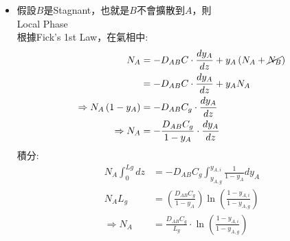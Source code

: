 \documentclass[../main.tex]{subfiles}
\begin{document}
\begin{itemize}
\begin{itemize}
\begin{figure}[H]
        \caption{已知邊界濃度，求交界面濃度示意圖}
      \end{figure}
      當題目假設濃度很稀薄，且亨利定律在各溫度下為定值，則可用代數法，得到($x_{A,i},y_{A,i}$)
      \begin{align}
        &\frac{y_{A,g}-y_{A,i}}{x_{A,i}-x_{A,l}} = -\frac{k'_x}{k'_y} \nonumber\\
        \implies \quad & y_{A,g}-y_{A,i} = -\frac{k'_x}{k'_y}\left(x_{A,i}-x_{A,l}\right) \nonumber\\
        \implies \quad & y_{A,g} + \frac{k'_x}{k'_y} x_{A,l} = y_{A,i} + \frac{k'_x}{k'_y} x_{A,i} \nonumber\\
        \implies \quad & y_{A,g} + \frac{k'_x}{k'_y} x_{A,l} = H_A x_{A,i} + \frac{k'_x}{k'_y} x_{A,i} \nonumber\\
        \implies \quad & y_{A,g} + \frac{k'_x}{k'_y} x_{A,l} = \left(H_A + \frac{k'_x}{k'_y}\right) x_{A,i} \nonumber\\
        \implies \quad & \boxed{x_{A,i} = \frac{y_{A,g} + \frac{k'_x}{k'_y} x_{A,l}}{H_A + \frac{k'_x}{k'_y}}}
      \end{align}
    \item 假設$B$是Stagnant，也就是$B$不會擴散到$A$，則\\
    Local Phase\\
    根據Fick's 1st Law，在氣相中:
    \begin{align}
      N_A &= -D_{AB} C\cdot \frac{dy_A}{dz}+y_A\left(N_A+\cancel{N_B}\right) \nonumber\\
      &= -D_{AB} C\cdot \frac{dy_A}{dz}+y_A N_A \nonumber\\
      \Rightarrow N_A\left(1-y_A\right) &= -D_{AB} C_g\cdot \frac{dy_A}{dz} \nonumber\\
      \Rightarrow N_A &= -\frac{D_{AB}C_g}{1-y_A}\cdot \frac{dy_A}{dz}
    \end{align}
    積分:
    \begin{align}
      N_A\int_{0}^{Lg} dz &= -D_{AB}C_g\int_{y_{A,g}}^{y_{A,i}} \frac{1}{1-y_A} dy_A \nonumber\\
      N_A L_g &= \left(
        \frac{D_{AB}C_g}{1-y_A}
      \right)\ln \left(\frac{1-y_{A,i}}{1-y_{A,g}}\right) \nonumber\\
      \Rightarrow N_A &= \frac{D_{AB}C_g}{L_g}\cdot \ln \left(\frac{1-y_{A,i}}{1-y_{A,g}}\right)

\end{align}
\end{itemize}
\end{itemize}
\end{document}
